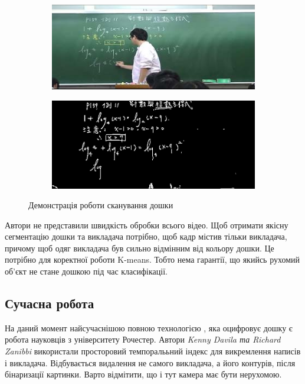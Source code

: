 \begin{figure}[h]
  \centering
  \begin{subfigure}[b]{0.3\textwidth}
    \centering
    \includegraphics[width=\textwidth]{images/yeh_1}
  \end{subfigure}
  \begin{subfigure}[b]{0.3\textwidth}
    \centering
    \includegraphics[width=\textwidth]{images/yeh_2}
  \end{subfigure}
  \label{fig:yeh}
  \caption{Демонстрація роботи сканування дошки}
\end{figure}

Автори не представили швидкість обробки всього відео. Щоб отримати якісну сегментацію
дошки та викладача потрібно, щоб кадр містив тільки викладача, причому щоб одяг викладача
був сильно відмінним від кольору дошки. Це потрібно для коректної роботи K-means.
Тобто нема гарантії, що якийсь рухомий об'єкт не стане  дошкою під час класифікації.

\subsection{Сучасна робота}

На даний момент найсучаснішою повною технологією \cite{davila:2017}, яка оцифровує дошку є робота
науковців з університету Рочестер. Автори \textit{Kenny Davila та Richard Zanibbi}
використали просторовий темпоралььний індекс для викремлення написів і викладача.
Відбувається видалення не самого викладача,  а його контурів, після бінаризації картинки.
Варто відмітити, що і тут камера має бути нерухомою.

